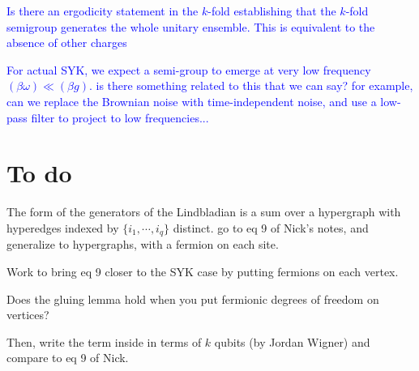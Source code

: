 \documentclass{article}
\theoremstyle{definition}
\newcommand{\NL}[1]{\textcolor{blue}{#1}}
\begin{document}
    \NL{Is there an ergodicity statement in the $k$-fold establishing that the $k$-fold semigroup generates the whole unitary ensemble. This is equivalent to the absence of other charges}

    \NL{For actual SYK, we expect a semi-group to emerge at very low frequency $(\beta\omega)\ll (\beta g)$. is there something related to this that we can say? for example, can we replace the Brownian noise with time-independent noise, and use a low-pass filter to project to low frequencies...}

    \section{To do}

    The form of the generators of the Lindbladian is a sum over a hypergraph with hyperedges indexed by $\{i_1,\cdots ,i_q\}$ distinct. go to eq 9 of Nick's notes, and generalize to hypergraphs, with a fermion on each site. 

    Work to bring eq 9 closer to the SYK case by putting fermions on each vertex. 

    Does the gluing lemma hold when you put fermionic degrees of freedom on vertices?

    
    
    
    Then, write the term inside in terms of $k$ qubits (by Jordan Wigner) and compare to eq 9 of Nick.

    
    
\end{document}
